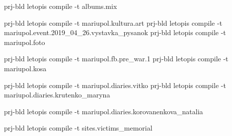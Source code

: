  
 
 
 
 

prj-bld letopis compile -t albums.mix

prj-bld letopis compile -t mariupol.kultura.art
prj-bld letopis compile -t mariupol.event.2019_04_26.vystavka_pysanok
prj-bld letopis compile -t mariupol.foto

prj-bld letopis compile -t mariupol.fb.pre_war.1
prj-bld letopis compile -t mariupol.kosa

prj-bld letopis compile -t mariupol.diaries.vitko
prj-bld letopis compile -t mariupol.diaries.krutenko_maryna

prj-bld letopis compile -t mariupol.diaries.korovanenkova_natalia

prj-bld letopis compile -t sites.victims_memorial
